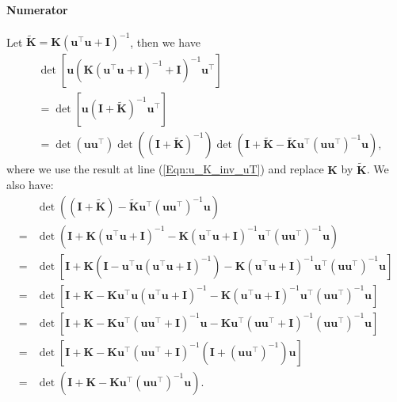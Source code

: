 \paragraph{Numerator}
Let $\widetilde{\mathbf{K}} = \mathbf{K} (\mathbf{u}^\top \mathbf{u} + \mathbf{I})^{-1}$, then we have
\begin{align*}
    &\det [\mathbf{u}\left(\mathbf{K}(\mathbf{u}^\top\mathbf{u}+\mathbf{I})^{-1} + \mathbf{I}\right)^{-1}\mathbf{u}^\top] 
    \\
    &= \det [\mathbf{u}\left( \mathbf{I}+\widetilde{\mathbf{K}} \right)^{-1}\mathbf{u}^\top] 
    \\
    & = \det (\mathbf{u} \mathbf{u}^\top) \det \left((\mathbf{I}+\widetilde{\mathbf{K}})^{-1}\right) \det \left( \mathbf{I} + \widetilde{\mathbf{K}} - \widetilde{\mathbf{K}}\mathbf{u}^\top (\mathbf{u} \mathbf{u}^\top)^{-1} \mathbf{u}\right),
\end{align*}
where we use the result at line  (\ref{Eqn:u_K_inv_uT}) and replace $\mathbf{K}$ by $\widetilde{\mathbf{K}}$. We also have: 
\begin{align*}
    & \det \left( (\mathbf{I} + \widetilde{\mathbf{K}}) - \widetilde{\mathbf{K}}\mathbf{u}^\top (\mathbf{u} \mathbf{u}^\top)^{-1} \mathbf{u}\right)
\\
    = &\det \left( \mathbf{I} + \mathbf{K} (\mathbf{u}^\top \mathbf{u} + \mathbf{I})^{-1} - \mathbf{K} (\mathbf{u}^\top \mathbf{u} + \mathbf{I})^{-1}\mathbf{u}^\top (\mathbf{u} \mathbf{u}^\top)^{-1} \mathbf{u}\right)
\\
    = &  \det \left[ \mathbf{I} + \mathbf{K} \left( \mathbf{I} - \mathbf{u}^\top \mathbf{u} (\mathbf{u}^\top \mathbf{u} + \mathbf{I})^{-1} \right) - \mathbf{K} (\mathbf{u}^\top \mathbf{u} + \mathbf{I})^{-1}\mathbf{u}^\top (\mathbf{u} \mathbf{u}^\top)^{-1} \mathbf{u}\right] 
\\
    = &  \det \left[ \mathbf{I} + \mathbf{K} - \mathbf{K} \mathbf{u}^\top \mathbf{u} (\mathbf{u}^\top \mathbf{u} + \mathbf{I})^{-1}  - \mathbf{K} (\mathbf{u}^\top \mathbf{u} + \mathbf{I})^{-1}\mathbf{u}^\top (\mathbf{u} \mathbf{u}^\top)^{-1} \mathbf{u}\right] 
\\
    = &  \det \left[ \mathbf{I} + \mathbf{K} - \mathbf{K} \mathbf{u}^\top (\mathbf{u} \mathbf{u}^\top + \mathbf{I})^{-1}\mathbf{u}  - \mathbf{K} \mathbf{u}^\top ( \mathbf{u}\mathbf{u}^\top + \mathbf{I})^{-1} (\mathbf{u} \mathbf{u}^\top)^{-1} \mathbf{u}\right] 
\\ 
    = &  \det \left[ \mathbf{I} + \mathbf{K} - \mathbf{K} \mathbf{u}^\top (\mathbf{u} \mathbf{u}^\top + \mathbf{I})^{-1} \left( \mathbf{I} + (\mathbf{u} \mathbf{u}^\top)^{-1} \right)  \mathbf{u} \right] 
\\ 
    = &  \det \left( \mathbf{I} + \mathbf{K} - \mathbf{K} \mathbf{u}^\top (\mathbf{u} \mathbf{u}^\top)^{-1}  \mathbf{u} \right).
\end{align*}
